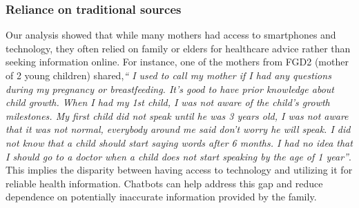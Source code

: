 \subsubsection{Reliance on traditional sources}
Our analysis showed that while many mothers had access to smartphones and technology, they often relied on family or elders for healthcare advice rather than seeking information online. For instance, one of the mothers from FGD2 (mother of 2 young children) shared,\textit{`` I used to call my mother if I had any questions during my pregnancy or breastfeeding. It's good to have prior knowledge about child growth. When I had my 1st child, I was not aware of the child’s growth milestones. My first child did not speak until he was 3 years old, I was not aware that it was not normal, everybody around me said don’t worry he will speak. I did not know that a child should start saying words after 6 months. I had no idea that I should go to a doctor when a child does not start speaking by the age of 1 year''}. This implies the disparity between having access to technology and utilizing it for reliable health information. Chatbots can help address this gap and reduce dependence on potentially inaccurate information provided by the family. 



